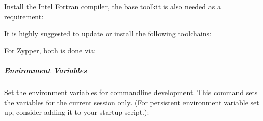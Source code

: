 \documentclass[letterpaper,11pt,english]{sphinxmanual}
\begin{document}
\sphinxAtStartPar
Install the Intel Fortran compiler, the base toolkit is also needed as a
requirement:

\begin{sphinxVerbatim}[commandchars=\\\{\}]
   
   
\end{sphinxVerbatim}

\sphinxAtStartPar
It is highly suggested to update or install the following toolchains:

\begin{sphinxVerbatim}[commandchars=\\\{\}]
  
    
   
\end{sphinxVerbatim}

\sphinxAtStartPar
For Zypper, both is done via:

\begin{sphinxVerbatim}[commandchars=\\\{\}]
   
   
  
    
    
\end{sphinxVerbatim}


\subparagraph{Environment Variables}
\label{\detokenize{technical/installation/orbfit:environment-variables}}
\sphinxAtStartPar
Set the environment variables for command\sphinxhyphen{}line development. This command sets
the variables for the current session only. (For persistent environment
variable set up, consider adding it to your startup script.):

\begin{sphinxVerbatim}[commandchars=\\\{\}]
 
\end{sphinxVerbatim}
\end{document}
